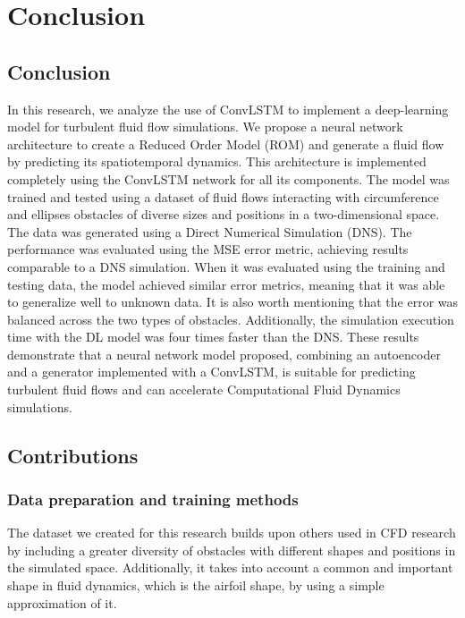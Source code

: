 
\chapter{Conclusion}
\label{ch:Conclusion}

\section{Conclusion}
\label{sec:Conclusion}

In this research, we analyze the use of ConvLSTM to implement a deep-learning model for turbulent fluid flow simulations. We propose a neural network architecture to create a Reduced Order Model (ROM) and generate a fluid flow by predicting its spatiotemporal dynamics. This architecture is implemented completely using the ConvLSTM network for all its components. The model was trained and tested using a dataset of fluid flows interacting with circumference and ellipses obstacles of diverse sizes and positions in a two-dimensional space. The data was generated using a Direct Numerical Simulation (DNS). The performance was evaluated using the MSE error metric, achieving results comparable to a DNS simulation. When it was evaluated using the training and testing data, the model achieved similar error metrics, meaning that it was able to generalize well to unknown data. It is also worth mentioning that the error was balanced across the two types of obstacles. Additionally, the simulation execution time with the DL model was four times faster than the DNS. These results demonstrate that a neural network model proposed, combining an autoencoder and a generator implemented with a ConvLSTM, is suitable for predicting turbulent fluid flows and can accelerate Computational Fluid Dynamics simulations.

\section{Contributions}
\label{sec:Contributions}

\subsection{Data preparation and training methods}
The dataset we created for this research builds upon others used in CFD research by including a greater diversity of obstacles with different shapes and positions in the simulated space. Additionally, it takes into account a common and important shape in fluid dynamics, which is the airfoil shape, by using a simple approximation of it.

